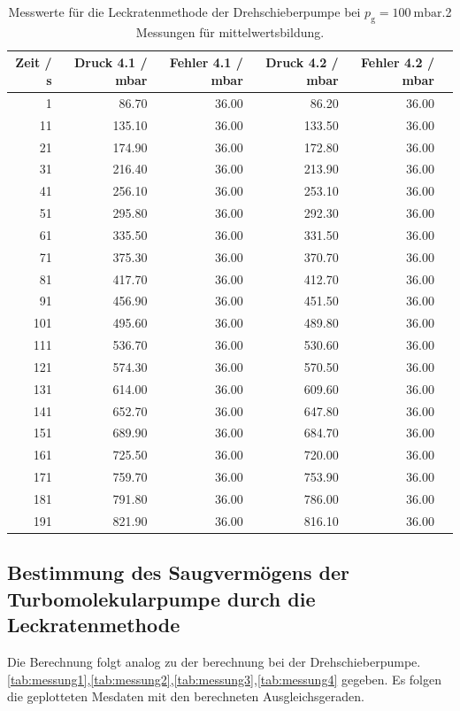 \begin{table}[H]
  \caption{Messwerte für die Leckratenmethode der Drehschieberpumpe bei $p_\text{g} = \qty{100}{\milli\bar}$.2 Messungen für mittelwertsbildung.}
\label{tab:14} 
\begin{tabular}{rrrrrr}
\toprule
Zeit / s & Druck 4.1 / mbar & Fehler 4.1 / mbar & Druck 4.2 / mbar & Fehler 4.2 / mbar \\
\midrule
1 & 86.70 & 36.00 & 86.20 & 36.00 \\
11 & 135.10 & 36.00 & 133.50 & 36.00 \\
21 & 174.90 & 36.00 & 172.80 & 36.00 \\
31 & 216.40 & 36.00 & 213.90 & 36.00 \\
41 & 256.10 & 36.00 & 253.10 & 36.00 \\
51 & 295.80 & 36.00 & 292.30 & 36.00 \\
61 & 335.50 & 36.00 & 331.50 & 36.00 \\
71 & 375.30 & 36.00 & 370.70 & 36.00 \\
81 & 417.70 & 36.00 & 412.70 & 36.00 \\
91 & 456.90 & 36.00 & 451.50 & 36.00 \\
101 & 495.60 & 36.00 & 489.80 & 36.00 \\
111 & 536.70 & 36.00 & 530.60 & 36.00 \\
121 & 574.30 & 36.00 & 570.50 & 36.00 \\
131 & 614.00 & 36.00 & 609.60 & 36.00 \\
141 & 652.70 & 36.00 & 647.80 & 36.00 \\
151 & 689.90 & 36.00 & 684.70 & 36.00 \\
161 & 725.50 & 36.00 & 720.00 & 36.00 \\
171 & 759.70 & 36.00 & 753.90 & 36.00 \\
181 & 791.80 & 36.00 & 786.00 & 36.00 \\
191 & 821.90 & 36.00 & 816.10 & 36.00 \\
\bottomrule
\end{tabular}
\end{table}



\subsection{Bestimmung des Saugvermögens der Turbomolekularpumpe durch die Leckratenmethode}
\label{sec:100}
Die Berechnung folgt analog zu der berechnung bei der Drehschieberpumpe.
 \autoref{tab:messung1},\autoref{tab:messung2},\autoref{tab:messung3},\autoref{tab:messung4} gegeben. 
 Es folgen die geplotteten Mesdaten mit den berechneten Ausgleichsgeraden.

